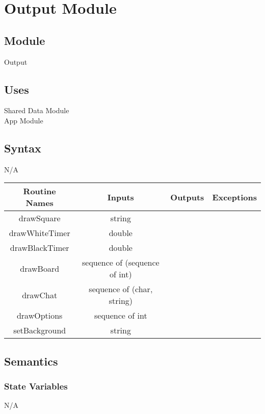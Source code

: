 \documentclass{article}
\begin{document}
\newpage
\section*{Output Module}
    \subsection*{Module}
        Output
    
    \subsection*{Uses}
        Shared Data Module \\
        App Module
    
    \subsection*{Syntax}
        N/A
        
        \begin{center}
            \begin{tabular}{|c|c|c|c|} 
                \hline
                Routine Names & Inputs & Outputs & Exceptions \\
                \hline
                drawSquare & string & &  \\ 
                \hline
                drawWhiteTimer & double &  &  \\ 
                \hline
                drawBlackTimer & double &  &  \\ 
                \hline
                drawBoard & sequence of (sequence of int) &  &  \\ 
                \hline
                drawChat & sequence of (char, string) &  &  \\ 
                \hline
                drawOptions & sequence of int &  &  \\ 
                \hline
                setBackground & string  &  &  \\ 
                \hline
            \end{tabular}
        \end{center}
    
    \subsection*{Semantics}
        \subsubsection*{State Variables}
            N/A
\end{document}

